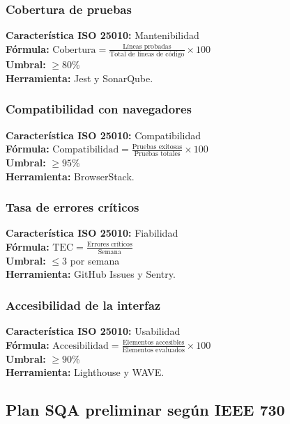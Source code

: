 \documentclass{article}
\begin{document}
\subsubsection{Cobertura de pruebas}
\textbf{Característica ISO 25010:} Mantenibilidad\\
\textbf{Fórmula:} $\text{Cobertura} = \frac{\text{Líneas probadas}}{\text{Total de líneas de código}} \times 100$\\
\textbf{Umbral:} $\geq 80\%$\\
\textbf{Herramienta:} Jest y SonarQube.

\subsubsection{Compatibilidad con navegadores}
\textbf{Característica ISO 25010:} Compatibilidad\\
\textbf{Fórmula:} $\text{Compatibilidad} = \frac{\text{Pruebas exitosas}}{\text{Pruebas totales}} \times 100$\\
\textbf{Umbral:} $\geq 95\%$\\
\textbf{Herramienta:} BrowserStack.

\subsubsection{Tasa de errores críticos}
\textbf{Característica ISO 25010:} Fiabilidad\\
\textbf{Fórmula:} $\text{TEC} = \frac{\text{Errores críticos}}{\text{Semana}}$\\
\textbf{Umbral:} $\leq 3$ por semana\\
\textbf{Herramienta:} GitHub Issues y Sentry.

\subsubsection{Accesibilidad de la interfaz}
\textbf{Característica ISO 25010:} Usabilidad\\
\textbf{Fórmula:} $\text{Accesibilidad} = \frac{\text{Elementos accesibles}}{\text{Elementos evaluados}} \times 100$\\
\textbf{Umbral:} $\geq 90\%$\\
\textbf{Herramienta:} Lighthouse y WAVE.

\subsection{Plan SQA preliminar según IEEE 730}
\end{document}
